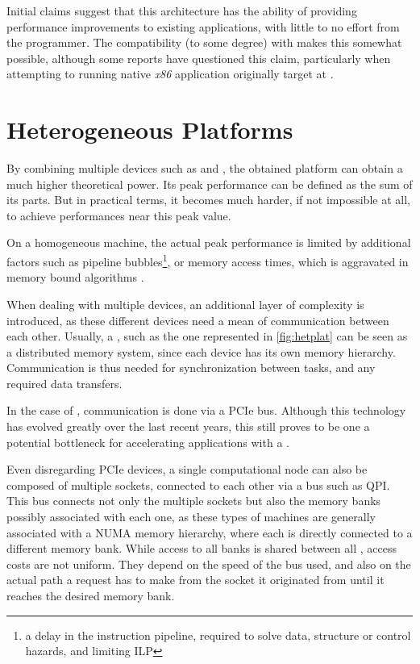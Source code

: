 \documentclass[main.tex]{subfiles}
\begin{document}
Initial claims suggest that this architecture has the ability of providing performance improvements to existing applications, with little to no effort from the programmer. The compatibility (to some degree) with  makes this somewhat possible, although some reports have questioned this claim, particularly when attempting to running native \textit{x86} application originally target at \xeon \cpus\cite{MIC:Nvidia}.


\section{Heterogeneous Platforms}

By combining multiple devices such as \cpus and \gpus, the obtained platform can obtain a much higher theoretical power. Its peak performance can be defined as the sum of its parts. But in practical terms, it becomes much harder, if not impossible at all, to achieve performances near this peak value.

On a homogeneous machine, the actual peak performance is limited by additional factors such as pipeline bubbles\footnote{a delay in the instruction pipeline, required to solve data, structure or control hazards, and limiting \ac{ILP} }, or memory access times, which is aggravated in memory bound algorithms \cite{williams2009roofline}.

When dealing with multiple devices, an additional layer of complexity is introduced, as these different devices need a mean of communication between each other. Usually, a \hetplat, such as the one represented in \cref{fig:hetplat} can be seen as a distributed memory system, since each device has its own memory hierarchy. Communication is thus needed for synchronization between tasks, and any required data transfers.


In the case of \gpus, communication is done via a \acs{PCIe} bus. Although this technology has evolved greatly over the last recent years, this still proves to be one a potential bottleneck for accelerating applications with a \gpu.

Even disregarding \acs{PCIe} devices, a single computational node can also be composed of multiple \cpu sockets, connected to each other via a bus such as \ac{QPI}. This bus connects not only the multiple sockets but also the memory banks possibly associated with each one, as these types of machines are generally associated with a \acs{NUMA} memory hierarchy, where each \cpu is directly connected to a different memory bank. While access to all banks is shared between all \cpus, access costs are not uniform. They depend on the speed of the bus used, and also on the actual path a request has to make from the socket it originated from until it reaches the desired memory bank.
\end{document}
